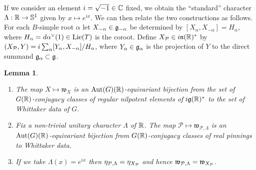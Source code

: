 \documentclass{article}
\newtheorem{lem}[thm]{Lemma}
\theoremstyle{definition}
\numberwithin{equation}{section}
\renewcommand{\-}{\hyp{}}
\newcommand{\g}{\mathfrak g}
\renewcommand{\P}{\mathcal P}
\newcommand{\w}{\mathfrak w}
\begin{document}
If we consider an element $i=\sqrt{-1} \in \mathbb{C}$ fixed, we obtain the ``standard'' character $\Lambda : \mathbb{R} \to \mathbb{S}^1$ given by $x \mapsto e^{ix}$. We can then relate the two constructions as follows. For each $B$-simple root $\alpha$ let $X_{-\alpha} \in \mathfrak{g}_{-\alpha}$ be determined by $[X_\alpha,X_{-\alpha}]=H_\alpha$, where $H_\alpha=d\alpha^\vee(1) \in \textrm{Lie}(T)$ is the coroot. Define $X_{\mathcal{P}} \in i\mathfrak{n}(\mathbb{R})^*$ by $(X_{\mathcal{P}},Y)=i\sum_\alpha [Y_\alpha,X_{-\alpha}]/H_\alpha$, where $Y_\alpha \in \mathfrak{g}_\alpha$ is the projection of $Y$ to the direct summand $\mathfrak{g}_\alpha \subset \mathfrak{g}$.

\begin{lem} \label{lem:w1}
\begin{enumerate}
\item The map $X \mapsto \w_X$ is an $\textrm{Aut}(G)(\mathbb{R})$-equivariant bijection from the set of $G(\mathbb{R})$-conjugacy classes of regular nilpotent elements of $i\g(\R)^*$ to the set of Whittaker data of $G$.
\item Fix a non-trivial unitary character $\Lambda$ of $\mathbb{R}$. The map $\P\mapsto \w_{\P,\Lambda}$ is an $\textrm{Aut}(G)(\mathbb{R})$-equivariant bijection from $G(\mathbb{R})$-conjugacy classes of real pinnings to Whittaker data.
\item If we take $\Lambda(x)=e^{ix}$ then $\eta_{\mathcal{P},\Lambda}=\eta_{X_{\mathcal{P}}}$ and hence $\mathfrak{w}_{\mathcal{P},\Lambda}=\mathfrak{w}_{X_{\mathcal{P}}}$.
\end{enumerate}
\end{lem}
\end{document}

